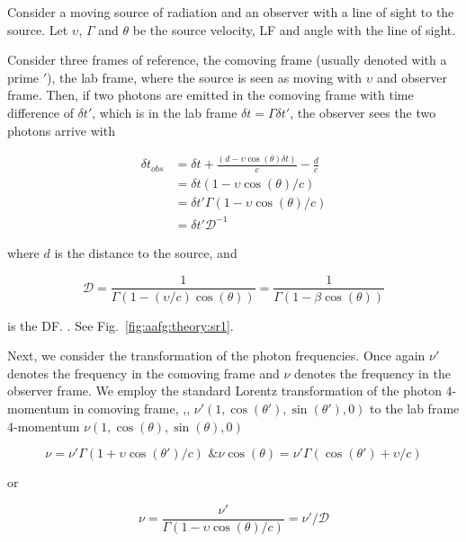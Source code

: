 Consider a moving source of radiation and an observer with a line of sight to the source. Let $\upsilon$, $\Gamma$ and $\theta$ be the source velocity, \ac{LF} and angle with the line of sight. 

Consider three frames of reference, the comoving frame (usually denoted with a prime $'$), the lab frame, where the source is seen as moving with $\upsilon$ and observer frame. Then, if two photons are emitted in the comoving frame with time difference of $\delta t'$, which is in the lab frame $\delta t = \Gamma \delta t'$, the observer sees the two photons arrive with 

\begin{eqnarray}
\delta t_{obs} &= \delta t + \frac{(d - \upsilon\cos(\theta) \delta t)}{c} - \frac{d}{c} \\
&= \delta t (1 - \upsilon \cos(\theta) / c) \\
&= \delta t' \Gamma (1 - \upsilon \cos(\theta) / c)\\
&= \delta t' \mathcal{D}^{-1}
\end{eqnarray}

where $d$ is the distance to the source, and 

\begin{equation}
\mathcal{D} = \frac{1}{\Gamma(1 - (\upsilon/c) \cos(\theta))} = \frac{1}{\Gamma(1 - \beta\cos(\theta))}
\end{equation}

is the \ac{DF}. 
.
See Fig.~\ref{fig:aafg:theory:sr1}.

Next, we consider the transformation of the photon frequencies. 
Once again $\nu'$ denotes the frequency in the comoving frame and $\nu$ denotes the frequency in the observer frame. 
We employ the standard Lorentz transformation of the photon $4$-momentum in comoving frame, \eg,, $\nu'(1, \cos(\theta'), \sin(\theta'),0)$ to the lab frame $4$-momentum $\nu(1, \cos(\theta), \sin(\theta), 0)$

\begin{equation}
\nu = \nu' \Gamma(1+\upsilon \cos(\theta')/c) \text{ \& } \nu\cos(\theta) = \nu' \Gamma (\cos(\theta') + \upsilon/c)
\end{equation}

or 

\begin{equation}
\nu = \frac{\nu'}{\Gamma (1 - \upsilon\cos(\theta)/c)} = \nu' / \mathcal{D}
\end{equation}

